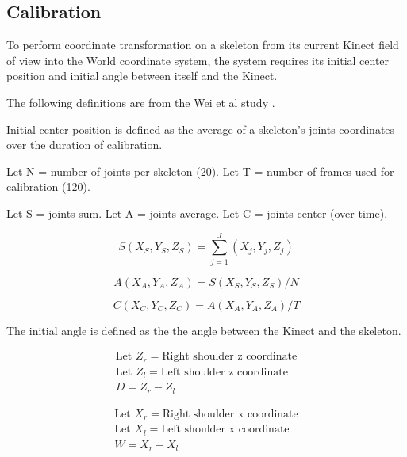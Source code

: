 \documentclass{sigchi}
\begin{document}
\subsection{Calibration}

To perform coordinate transformation on a skeleton from its current Kinect field of view into the World coordinate system, the system requires its initial center position and initial angle between itself and the Kinect.  

The following definitions are from the Wei et al study \cite{wei_kinect_calibration}.

Initial center position is defined as the average of a skeleton's joints coordinates over the duration of calibration.

Let N = number of joints per skeleton (20). Let T = number of frames used for calibration (120).

Let S = joints sum. Let A = joints average. Let C = joints center (over time). 

\begin{equation}
\label{eq:joints_sum}
S(X_S, Y_S, Z_S) = \sum_{j=1}^J (X_j, Y_j, Z_j)
\end{equation}

\begin{equation}
\label{eq:joints_average}
A(X_A, Y_A, Z_A) = S(X_S, Y_S, Z_S) / N
\end{equation}

\begin{equation}
\label{eq:joints_center}
C(X_C, Y_C, Z_C) = A(X_A, Y_A, Z_A) / T
\end{equation}

The initial angle is defined as the the angle between the Kinect and the skeleton.

\begin{equation}
\label{eq:theta_d}
\begin{gathered}
\text{Let } Z_r = \text{Right shoulder z coordinate} \\
\text{Let } Z_l = \text{Left shoulder z coordinate} \\
D = Z_r - Z_l
\end{gathered}
\end{equation}

\begin{equation}
\label{eq:theta_w}
\begin{gathered}
\text{Let } X_r = \text{Right shoulder x coordinate} \\
\text{Let } X_l = \text{Left shoulder x coordinate} \\
W = X_r - X_l
\end{gathered}
\end{equation}
\end{document}
